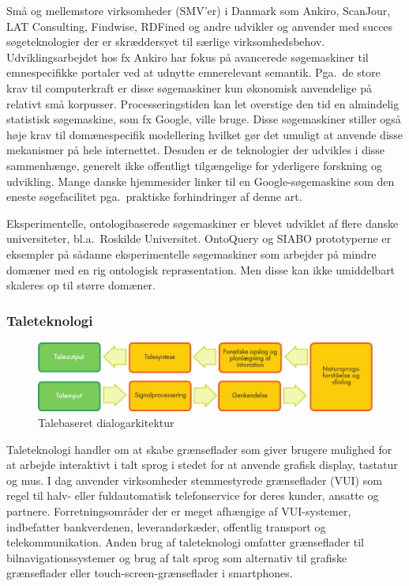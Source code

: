 \begin{multicols}{2}
\mbox{Sm\aa} og mellemstore virksomheder (SMV'er) i Danmark som Ankiro, ScanJour, LAT Consulting, Findwise, RDFined og andre udvikler og anvender med succes s\o geteknologier der er skr\ae ddersyet til s\ae rlige virksomhedsbehov. Udviklingsarbejdet hos fx Ankiro har fokus \mbox{p\aa} avancerede s\o gemaskiner til emnespecifikke portaler ved at udnytte emnerelevant semantik. Pga.\ de store krav til computerkraft er disse s\o gemaskiner kun \o konomisk anvendelige \mbox{p\aa} relativt \mbox{sm\aa} korpusser. Processeringstiden kan let overstige den tid en almindelig statistisk s\o gemaskine, som fx Google, ville bruge. Disse s\o gemaskiner stiller \mbox{ogs\aa} h\o je krav til dom\ae nespecifik modellering hvilket g\o r det umuligt at anvende disse mekanismer \mbox{p\aa} hele internettet. Desuden er de teknologier der udvikles i disse sammenh\ae nge, generelt ikke offentligt tilg\ae ngelige for yderligere forskning og udvikling. Mange danske hjemmesider linker til en Google-s\o gemaskine som den eneste s\o gefacilitet pga.\ praktiske forhindringer af denne art.

Eksperimentelle, ontologibaserede s\o ge\-maskiner er blevet udviklet af flere danske universiteter, bl.a.\ Roskilde Universitet. OntoQuery og SIABO prototyperne er eksempler \mbox{p\aa} s\aa danne eksperimentelle s\o gemaskiner som arbejder \mbox{p\aa} mindre dom\ae ner med en rig ontologisk repr\ae sentation.   Men disse kan ikke umiddelbart skaleres op til st\o rre dom\ae ner.
  
\subsubsection{Taleteknologi}

\begin{figure}[hb]
  \center 
  \includegraphics[width=\textwidth]{../_media/danish/simple_speech-based_dialogue_architecture}
  \caption{Talebaseret dialogarkitektur}
  \label{fig:dialoguearch_de}
\end{figure}

 Taleteknologi handler om at skabe gr\ae nseflader som giver brugere mulighed for at arbejde interaktivt i talt sprog i stedet for at anvende grafisk display, tastatur og mus. I dag anvender virksomheder stemmestyrede gr\ae nseflader (VUI) som regel til halv- eller fuldautomatisk telefonservice for deres kunder, ansatte og partnere. Forretningsomr\aa der der er meget afh\ae ngige af VUI-systemer, indbefatter bankverdenen, leverand\o rk\ae der, offentlig transport og telekommunikation. Anden brug af taleteknologi omfatter gr\ae nseflader til bilnavigations\-systemer og brug af talt sprog som alternativ til grafiske gr\ae nseflader eller touch-screen-gr\ae nseflader i smart\-phones. 


\end{multicols}
